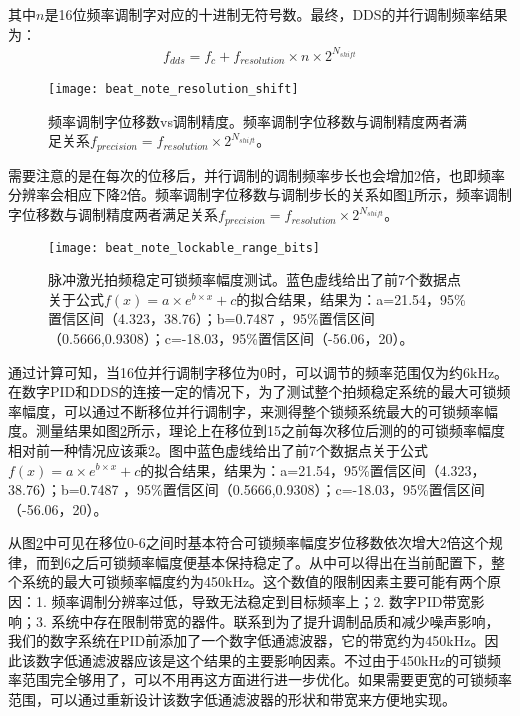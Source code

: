 其中$n$是16位频率调制字对应的十进制无符号数。最终，DDS的并行调制频率结果为：
\begin{align}
    f_{dds}=f_c+f_{resolution}\times n \times 2^{N_{shift}}
\end{align}

\begin{figure}
    \centering
    \caption[频率调制字位移数vs调制精度
    ]{频率调制字位移数vs调制精度。频率调制字位移数与调制精度两者满足关系$f_{precision}=f_{resolution}\times2^{N_{shift}}$。
    \label{fig:beat_note_resolution_shift}}
    \texttt{[image: beat\_note\_resolution\_shift]}
\end{figure}

需要注意的是在每次的位移后，并行调制的调制频率步长也会增加2倍，也即频率分辨率会相应下降2倍。频率调制字位移数与调制步长的关系如图\ref{fig:beat_note_resolution_shift}所示，频率调制字位移数与调制精度两者满足关系$f_{precision}=f_{resolution}\times2^{N_{shift}}$。



\begin{figure}
    \centering
    \caption[脉冲激光拍频稳定可锁频率幅度测试]{脉冲激光拍频稳定可锁频率幅度测试。蓝色虚线给出了前7个数据点关于公式$f(x)=a\times e^{b\times x}+c$的拟合结果，结果为：a=21.54，95\%置信区间（4.323，38.76）；b=0.7487 ，95\%置信区间（0.5666,0.9308）；c=-18.03，95\%置信区间（-56.06，20）。\label{fig:beat_note_lockable_range_bits}}
    \texttt{[image: beat\_note\_lockable\_range\_bits]}
\end{figure}

通过计算可知，当16位并行调制字移位为0时，可以调节的频率范围仅为约6kHz。在数字PID和DDS的连接一定的情况下，为了测试整个拍频稳定系统的最大可锁频率幅度，可以通过不断移位并行调制字，来测得整个锁频系统最大的可锁频率幅度。测量结果如图\ref{fig:beat_note_lockable_range_bits}所示，理论上在移位到15之前每次移位后测的的可锁频率幅度相对前一种情况应该乘2。图中蓝色虚线给出了前7个数据点关于公式$f(x)=a\times e^{b\times x}+c$的拟合结果，结果为：a=21.54，95\%置信区间（4.323，38.76）；b=0.7487 ，95\%置信区间（0.5666,0.9308）；c=-18.03，95\%置信区间（-56.06，20）。

从图\ref{fig:beat_note_lockable_range_bits}中可见在移位0-6之间时基本符合可锁频率幅度岁位移数依次增大2倍这个规律，而到6之后可锁频率幅度便基本保持稳定了。从中可以得出在当前配置下，整个系统的最大可锁频率幅度约为450kHz。这个数值的限制因素主要可能有两个原因：1. 频率调制分辨率过低，导致无法稳定到目标频率上；2. 数字PID带宽影响；3. 系统中存在限制带宽的器件。联系到为了提升调制品质和减少噪声影响，我们的数字系统在PID前添加了一个数字低通滤波器，它的带宽约为450kHz。因此该数字低通滤波器应该是这个结果的主要影响因素。不过由于450kHz的可锁频率范围完全够用了，可以不用再这方面进行进一步优化。如果需要更宽的可锁频率范围，可以通过重新设计该数字低通滤波器的形状和带宽来方便地实现。

